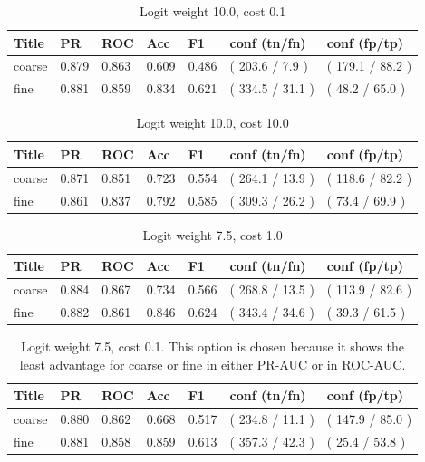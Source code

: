 \documentclass[ms]{nuthesis}
\begin{document}
\FloatBarrier
\begin{table}[H]
\centering
\caption{Logit weight 10.0, cost 0.1}
\label{tab:LogRegWt10-Cp1}
\begin{tabular}{|l||l||l||l||l||l||l|}\toprule
Title & PR & ROC & Acc & F1 & conf (tn/fn) & conf (fp/tp) \\ \midrule
coarse & 0.879 & 0.863 & 0.609 & 0.486 & ( 203.6 / 7.9 ) & ( 179.1 / 88.2 ) \\
fine & 0.881 & 0.859 & 0.834 & 0.621 & ( 334.5 / 31.1 ) & ( 48.2 / 65.0 ) \\ \bottomrule
\end{tabular}
\end{table}
\FloatBarrier

\FloatBarrier
\begin{table}[H]
\centering
\caption{Logit weight 10.0, cost 10.0}
\label{tab:LogRegWt10-C10}
\begin{tabular}{|l||l||l||l||l||l||l|}\toprule
Title & PR & ROC & Acc & F1 & conf (tn/fn) & conf (fp/tp) \\ \midrule
coarse & 0.871 & 0.851 & 0.723 & 0.554 & ( 264.1 / 13.9 ) & ( 118.6 / 82.2 ) \\
fine & 0.861 & 0.837 & 0.792 & 0.585 & ( 309.3 / 26.2 ) & ( 73.4 / 69.9 ) \\ \bottomrule
\end{tabular}
\end{table}
\FloatBarrier

\FloatBarrier
\begin{table}[H]
\centering
\caption{Logit weight 7.5, cost 1.0}
\label{tab:LogRegWt7p5-C1}
\begin{tabular}{|l||l||l||l||l||l||l|}\toprule
Title & PR & ROC & Acc & F1 & conf (tn/fn) & conf (fp/tp) \\ \midrule
coarse & 0.884 & 0.867 & 0.734 & 0.566 & ( 268.8 / 13.5 ) & ( 113.9 / 82.6 ) \\
fine & 0.882 & 0.861 & 0.846 & 0.624 & ( 343.4 / 34.6 ) & ( 39.3 / 61.5 ) \\ \bottomrule
\end{tabular}
\end{table}
\FloatBarrier

\FloatBarrier
\begin{table}[H]
\centering
\caption{Logit weight 7.5, cost 0.1. This option is chosen because it shows the least advantage for coarse
or fine in either PR-AUC or in ROC-AUC.}
\label{tab:LogRegWt7p5-Cp1}
\begin{tabular}{|l||l||l||l||l||l||l|}\toprule
Title & PR & ROC & Acc & F1 & conf (tn/fn) & conf (fp/tp) \\ \midrule
coarse & 0.880 & 0.862 & 0.668 & 0.517 & ( 234.8 / 11.1 ) & ( 147.9 / 85.0 ) \\
fine & 0.881 & 0.858 & 0.859 & 0.613 & ( 357.3 / 42.3 ) & ( 25.4 / 53.8 ) \\ \bottomrule
\end{tabular}
\end{table}
\FloatBarrier
\end{document}
